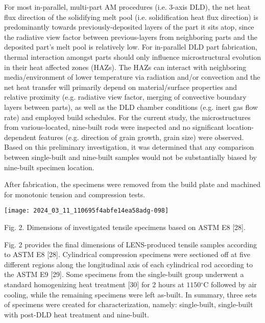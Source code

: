 \documentclass[10pt]{article}
\begin{document}
For most in-parallel, multi-part AM procedures (i.e. 3-axis DLD), the net heat flux direction of the solidifying melt pool (i.e. solidification heat flux direction) is predominantly towards previously-deposited layers of the part it sits atop, since the radiative view factor between previous-layers from neighboring parts and the deposited part's melt pool is relatively low. For in-parallel DLD part fabrication, thermal interaction amongst parts should only influence microstructural evolution in their heat affected zones (HAZs). The HAZs can interact with neighboring media/environment of lower temperature via radiation and/or convection and the net heat transfer will primarily depend on material/surface properties and relative proximity (e.g. radiative view factor, merging of convective boundary layers between parts), as well as the DLD chamber conditions (e.g. inert gas flow rate) and employed build schedules. For the current study, the microstructures from various-located, nine-built rods were inspected and no significant location-dependent features (e.g. direction of grain growth, grain size) were observed. Based on this preliminary investigation, it was determined that any comparison between single-built and nine-built samples would not be substantially biased by nine-built specimen location.

After fabrication, the specimens were removed from the build plate and machined for monotonic tension and compression tests.

\begin{center}
\texttt{[image: 2024\_03\_11\_110695f4abfe14ea58adg-098]}
\end{center}

Fig. 2. Dimensions of investigated tensile specimens based on ASTM E8 [28].

Fig. 2 provides the final dimensions of LENS-produced tensile samples according to ASTM E8 [28]. Cylindrical compression specimens were sectioned off at five different regions along the longitudinal axis of each cylindrical rod according to the ASTM E9 [29]. Some specimens from the single-built group underwent a standard homogenizing heat treatment [30] for 2 hours at $1150{ }^{\circ} \mathrm{C}$ followed by air cooling, while the remaining specimens were left as-built. In summary, three sets of specimens were created for characterization, namely: single-built, single-built with post-DLD heat treatment and nine-built.
\end{document}
